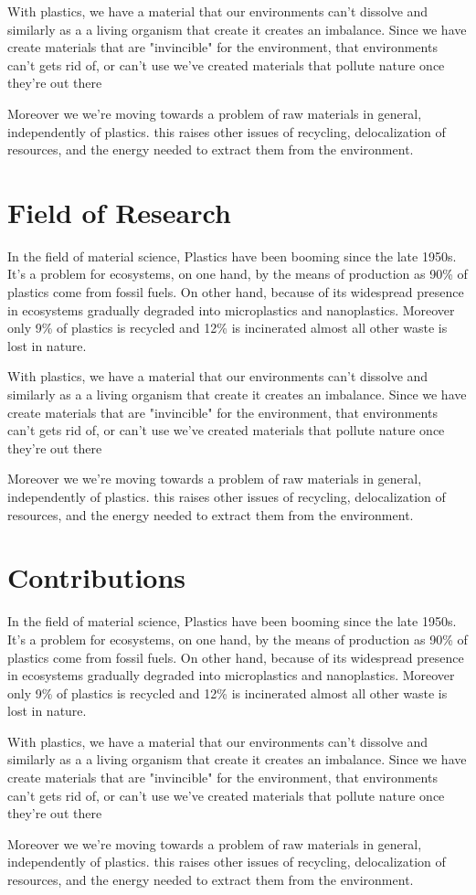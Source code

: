 With plastics, we have a material that our environments can't dissolve and similarly as a a living organism that create
it creates an imbalance. Since we have create materials that are "invincible" for the environment,  that environments can't gets rid of, or can't use
we've created materials that pollute nature once they're out there

Moreover we we're moving towards a problem of raw materials in general, independently of plastics. this raises other issues of recycling, 
delocalization of resources, and the energy needed to extract them from the environment.


\section{Field of Research}

In the field of material science, Plastics have been booming since the late 1950s\cite{geyer2017production}.
It's a problem for ecosystems, on one hand, by the means of production as 90\% of plastics come from fossil fuels. On other hand,
because of its widespread presence in ecosystems gradually degraded into microplastics and nanoplastics.
Moreover only 9\% of plastics is recycled and 12\% is incinerated almost all other waste is lost in nature\cite{natureeditorial}.

With plastics, we have a material that our environments can't dissolve and similarly as a a living organism that create
it creates an imbalance. Since we have create materials that are "invincible" for the environment,  that environments can't gets rid of, or can't use
we've created materials that pollute nature once they're out there

Moreover we we're moving towards a problem of raw materials in general, independently of plastics. this raises other issues of recycling, 
delocalization of resources, and the energy needed to extract them from the environment.

\section{Contributions}

In the field of material science, Plastics have been booming since the late 1950s\cite{geyer2017production}.
It's a problem for ecosystems, on one hand, by the means of production as 90\% of plastics come from fossil fuels. On other hand,
because of its widespread presence in ecosystems gradually degraded into microplastics and nanoplastics.
Moreover only 9\% of plastics is recycled and 12\% is incinerated almost all other waste is lost in nature\cite{natureeditorial}.

With plastics, we have a material that our environments can't dissolve and similarly as a a living organism that create
it creates an imbalance. Since we have create materials that are "invincible" for the environment,  that environments can't gets rid of, or can't use
we've created materials that pollute nature once they're out there

Moreover we we're moving towards a problem of raw materials in general, independently of plastics. this raises other issues of recycling, 
delocalization of resources, and the energy needed to extract them from the environment.
